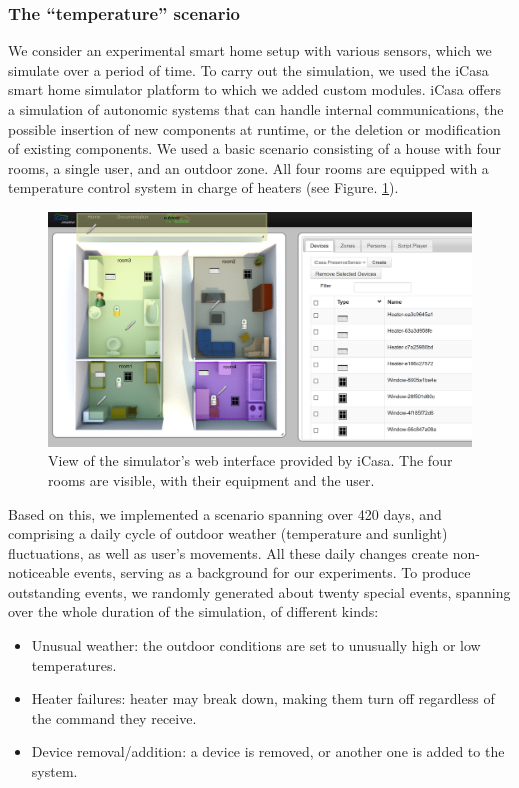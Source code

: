 \documentclass[entropy,article,submit,moreauthors,pdftex]{Definitions/mdpi}
\begin{document}
\subsubsection{The ``temperature'' scenario}
We consider an experimental smart home setup with various sensors, which we simulate over a period of time.
To carry out the simulation, we used the iCasa smart home simulator platform\cite{lalanda_self-aware_2017} 
to which we added custom modules. iCasa
offers a simulation of autonomic systems that can handle internal communications,
the possible insertion of new components at runtime, or the deletion or modification of existing
components. We used a basic scenario consisting of a house with four rooms,
a single user, and an outdoor zone. All four rooms are equipped
with a temperature control system in charge of heaters (see Figure.
\ref{fig:view}).

\begin{figure}[!ht]
    \centering
    \includegraphics[width=.8\linewidth]{figures/icasa_interface.png}
    \caption{View of the simulator's web interface provided by iCasa. The four
        rooms are visible, with their equipment and the user.}
    \label{fig:view}
\end{figure}

Based on this, we implemented a scenario spanning over 420 days, and
comprising a daily cycle of outdoor weather (temperature and sunlight) fluctuations, as well
as user's movements. All these daily changes create non-noticeable events,
serving as a background for our experiments. To produce outstanding
events, we randomly generated about twenty special events, spanning over the whole
duration of the simulation, of different kinds:

\begin{itemize}
    \item Unusual weather: the outdoor conditions are set to unusually high or
          low temperatures.
    \item Heater failures: heater may break down, making them turn off regardless
          of the command they receive.
    \item Device removal/addition: a device is removed, or another one is added
          to the system.
\end{itemize}
\end{document}
